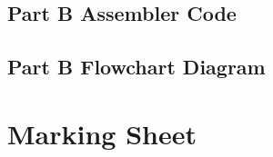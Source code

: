 \documentclass[letterpaper]{article}
\begin{document}
  \subsection{Part B Assembler Code}
    
\newpage
  \subsection{Part B Flowchart Diagram}
  \vspace{2cm}
    \noindent{}
\newpage

\section{Marking Sheet}
\end{document}
